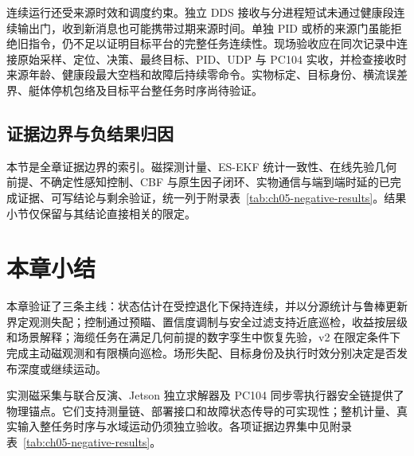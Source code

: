 连续运行还受来源时效和调度约束。独立 DDS 接收与分进程短试未通过健康段连续输出门，收到新消息也可能携带过期来源时间。单独 PID 或桥的来源门虽能拒绝旧指令，仍不足以证明目标平台的完整任务连续性。现场验收应在同次记录中连接原始采样、定位、决策、最终目标、PID、UDP 与 PC104 实收，并检查接收时来源年龄、健康段最大空档和故障后持续零命令。实物标定、目标身份、横流误差界、艇体停机包络及目标平台整任务时序尚待验证。

\subsection{证据边界与负结果归因}\label{sec:ch05-5-6}

本节是全章证据边界的索引。磁探测计量、ES-EKF 统计一致性、在线先验几何前提、不确定性感知控制、CBF 与原生因子闭环、实物通信与端到端时延的已完成证据、可写结论与剩余验证，统一列于附录表~\ref{tab:ch05-negative-results}。结果小节仅保留与其结论直接相关的限定。

\section{本章小结}\label{sec:ch05-5-8}

本章验证了三条主线：状态估计在受控退化下保持连续，并以分源统计与鲁棒更新界定观测失配；控制通过预瞄、置信度调制与安全过滤支持近底巡检，收益按层级和场景解释；海缆任务在满足几何前提的数字孪生中恢复先验，v2 在限定条件下完成主动磁观测和有限横向巡检。场形失配、目标身份及执行时效分别决定是否发布深度或继续运动。


实测磁采集与联合反演、Jetson 独立求解器及 PC104 同步零执行器安全链提供了物理锚点。它们支持测量链、部署接口和故障状态传导的可实现性；整机计量、真实输入整任务时序与水域运动仍须独立验收。各项证据边界集中见附录表~\ref{tab:ch05-negative-results}。
